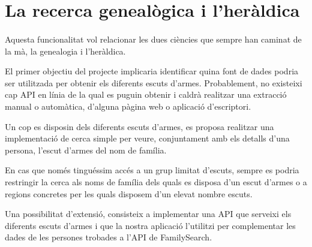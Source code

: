 \section{La recerca genealògica i l'heràldica}

    \paragraph{}
    Aquesta funcionalitat vol relacionar les dues ciències que sempre han caminat de la mà, la genealogia i l'heràldica.

    El primer objectiu del projecte implicaria identificar quina font de dades podria ser utilitzada per obtenir els diferents escuts d'armes. Probablement, no existeixi cap API en línia de la qual es puguin obtenir i caldrà realitzar una extracció manual o automàtica, d'alguna pàgina web o aplicació d'escriptori.

    Un cop es disposin dels diferents escuts d'armes, es proposa realitzar una implementació de cerca simple per veure, conjuntament amb els detalls d'una persona, l'escut d'armes del nom de família.

    En cas que només tinguéssim accés a un grup limitat d'escuts, sempre es podria restringir la cerca als noms de família dels quals es disposa d'un escut d'armes o a regions concretes per les quals disposem d'un elevat nombre escuts.

    Una possibilitat d'extensió, consisteix a implementar una API que serveixi els diferents escuts d'armes i que la nostra aplicació l'utilitzi per complementar les dades de les persones trobades a l'API de FamilySearch.
